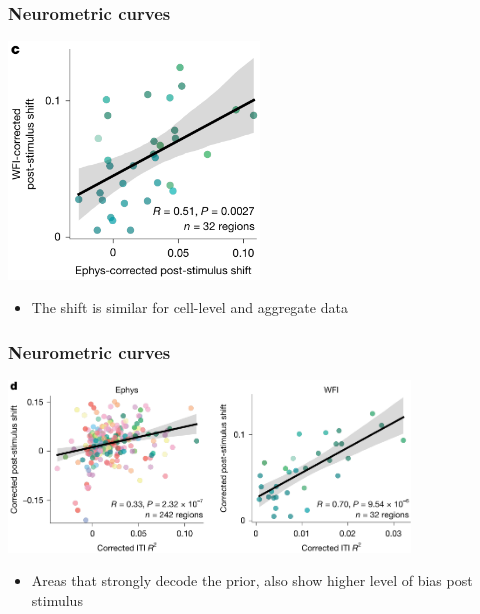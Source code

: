 \documentclass{beamer}
\begin{document}
\begin{frame}
  \frametitle{Neurometric curves}
  \begin{center}
    \includegraphics[width=0.5\textwidth, keepaspectratio]{./figure3c}
  \end{center}
  \begin{itemize}
    \item The shift is similar for cell-level and aggregate data
  \end{itemize}
\end{frame}

\begin{frame}
  \frametitle{Neurometric curves}
  \begin{center}
    \includegraphics[width=0.8\textwidth, keepaspectratio]{./figure3d}
  \end{center}
  \begin{itemize}
    \item Areas that strongly decode the prior, also show higher level of bias post stimulus
  \end{itemize}
\end{frame}
\end{document}

